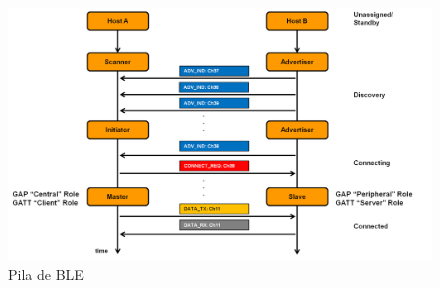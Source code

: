 \begin{figure}[h]
	\begin{center}
		\includegraphics[width=1\textwidth]{./images/rols_unicast.png}
		\caption{Pila de BLE \cite{ble_stack}}
		\label{ble_stack}
	\end{center}
\end{figure}

